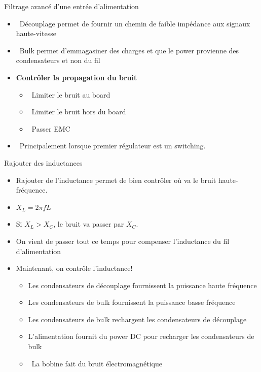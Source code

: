 \begin{frame}{Filtrage avancé d'une entrée d'alimentation}
    \begin{itemize}
        \item[] \textcolor{UDSgreenFierte}{\faTachometer*} ~Découplage permet de fournir un chemin de faible impédance aux signaux haute-vitesse
        \item[] \textcolor{UDSgreenFierte}{\faBatteryThreeQuarters} ~Bulk permet d'emmagasiner des charges et que le power provienne des condensateurs et non du fil
        \bigskip
        \item<2-> \textbf{Contrôler la propagation du bruit}
        \begin{itemize}
            \item<2->[] \textcolor{UDSgreenFierte}{\faArrowRight} ~Limiter le bruit au board
            \item<2->[] \textcolor{UDSgreenFierte}{\faArrowLeft} ~Limiter le bruit hors du board
            \item<2->[] \textcolor{UDSgreenFierte}{\faFileContract} ~Passer EMC
        \end{itemize}
        \item<3->[] \textcolor{UDSgreenFierte}{\faProjectDiagram} ~Principalement lorsque premier régulateur est un switching.
    \end{itemize}
\end{frame}

\begin{frame}{Rajouter des inductances}
    \begin{itemize}
        \item Rajouter de l'inductance permet de bien contrôler où va le bruit haute-fréquence.
        \item $X_L = 2\pi fL$
        \item Si $X_L > X_C$, le bruit va passer par $X_C$.
        \bigskip
        \item On vient de passer tout ce temps pour compenser l'inductance du fil d'alimentation
        \item<2-> Maintenant, on contrôle l'inductance!
        \begin{itemize}
            \item<2-> Les condensateurs de découplage fournissent la puissance haute fréquence
            \item<2-> Les condensateurs de bulk fournissent la puissance basse fréquence
            \item<2-> Les condensateurs de bulk rechargent les condensateurs de découplage
            \item<2-> L'alimentation fournit du power DC pour recharger les condensateurs de bulk
            \item<3->[] \hspace{-18pt} \textcolor{red}{\faBan}
                ~La bobine fait du bruit électromagnétique
        \end{itemize}
    \end{itemize}
\end{frame}

